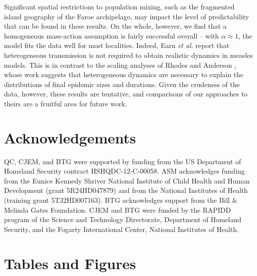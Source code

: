 \documentclass[10pt]{article}
\begin{document}
Significant spatial restrictions to population mixing, such as the fragmented island geography of the Faroe archipelago, may impact the level of predictability that can be found in these results. On the whole, however, we find that a homogeneous mass-action assumption is fairly successful overall -- with $\alpha \approx 1$, the model fits the data well for most localities. Indeed, Earn \textit{et al.} \cite{Earn2000} report that heterogeneous transmission is not required to obtain realistic dynamics in measles models. This is in contrast to the scaling analyses of Rhodes and Anderson \cite{Rhodes1996a, Rhodes1996b}, whose work suggests that heterogeneous dynamics are necessary to explain the distributions of final epidemic sizes and durations. Given the crudeness of the data, however, these results are tentative, and comparisons of our approaches to theirs are a fruitful area for future work.

























\section*{Acknowledgements}

QC, CJEM, and BTG were supported by funding from the US Department of Homeland Security contract HSHQDC-12-C-00058. ASM acknowledges funding from the Eunice Kennedy Shriver National Institute of Child Health and Human Development (grant 5R24HD047879) and from the National Institutes of Health (training grant 5T32HD007163). BTG acknowledges support from the Bill \& Melinda Gates Foundation. CJEM and BTG were funded by the RAPIDD program of the Science and Technology Directorate, Department of Homeland Security, and the Fogarty International Center, National Institutes of Health. 














\section*{Tables and Figures}
\end{document}
